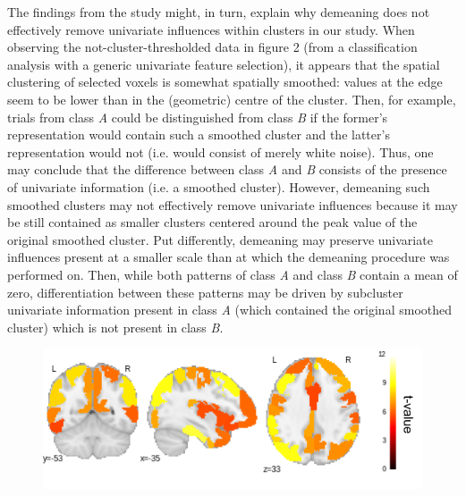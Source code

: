 \documentclass[jou,12pt,a4paper]{apa6}
\begin{document}
The findings from the  study might, in turn, explain why demeaning does not effectively remove univariate influences within clusters in our study. When observing the not-cluster-thresholded data in figure 2 (from a classification analysis with a generic univariate feature selection), it appears that the spatial clustering of selected voxels is somewhat spatially smoothed: values at the edge seem to be lower than in the (geometric) centre of the cluster. Then, for example, trials from class \emph{A} could be distinguished from class \emph{B} if the former's representation would contain such a smoothed cluster and the latter's representation would not (i.e. would consist of merely white noise). Thus, one may conclude that the difference between class \emph{A} and \emph{B} consists of the presence of univariate information (i.e. a smoothed cluster). However, demeaning such smoothed clusters may not effectively remove univariate influences because it may be still contained as smaller clusters centered around the peak value of the original smoothed cluster. Put differently, demeaning may preserve univariate influences present at a smaller scale than at which the demeaning procedure was performed on. Then, while both patterns of class \emph{A} and class \emph{B} contain a mean of zero, differentiation between these patterns may be driven by subcluster univariate information present in class \emph{A} (which contained the original smoothed cluster) which is not present in class \emph{B}. 

\begin{figure}[ht]
\centering
\includegraphics[width=\textwidth]{tmap}
\end{figure}
\end{document}
